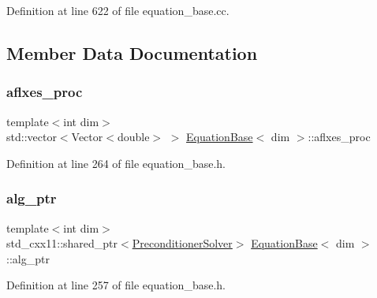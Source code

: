 Definition at line 622 of file equation\+\_\+base.\+cc.



\subsection{Member Data Documentation}
\mbox{\label{class_equation_base_aa5a26770211dc6c8b2c17e35deffa60b}} 
\subsubsection{\texorpdfstring{aflxes\+\_\+proc}{aflxes\_proc}}
{\footnotesize\ttfamily template$<$int dim$>$ \\
std\+::vector$<$Vector$<$double$>$ $>$ \hyperlink{class_equation_base}{Equation\+Base}$<$ dim $>$\+::aflxes\+\_\+proc\hspace{0.3cm}{\ttfamily [private]}}



Definition at line 264 of file equation\+\_\+base.\+h.

\mbox{\label{class_equation_base_aa4b83dfa34d4588cf3250a21ffc2e984}} 
\subsubsection{\texorpdfstring{alg\+\_\+ptr}{alg\_ptr}}
{\footnotesize\ttfamily template$<$int dim$>$ \\
std\+\_\+cxx11\+::shared\+\_\+ptr$<$\hyperlink{class_preconditioner_solver}{Preconditioner\+Solver}$>$ \hyperlink{class_equation_base}{Equation\+Base}$<$ dim $>$\+::alg\+\_\+ptr\hspace{0.3cm}{\ttfamily [private]}}



Definition at line 257 of file equation\+\_\+base.\+h.

\mbox{\label{class_equation_base_aedead29f1c4bb6b9f7b17b1fe1441c5f}} 
